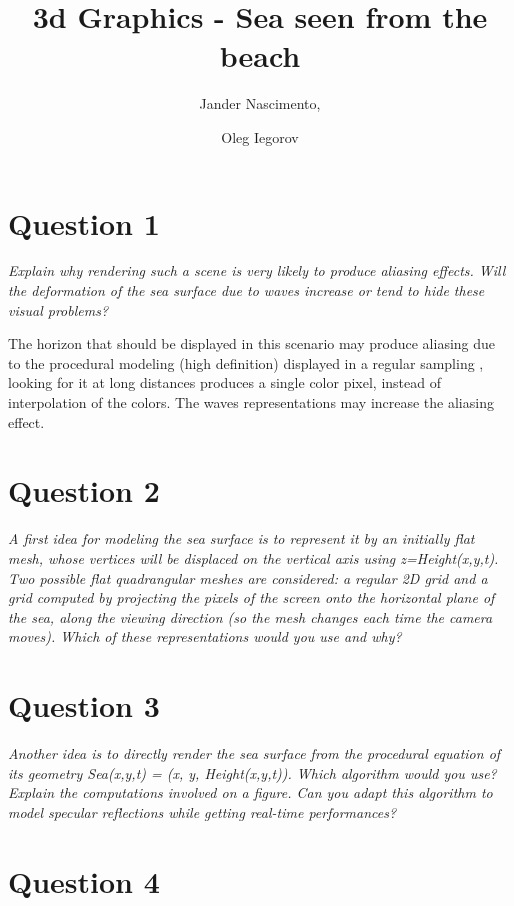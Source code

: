\documentclass{report}
\begin{document}
\title{3d Graphics - Sea seen from the beach}

\author{Jander Nascimento, 
\and Oleg Iegorov}

\maketitle

\section{Question 1}

\emph{Explain why rendering such a scene is very likely to produce aliasing effects. Will the
deformation of the sea surface due to waves increase or tend to hide these visual problems?}

The horizon that should be displayed in this scenario may produce aliasing due to the procedural modeling (high definition) displayed in a regular sampling \cite{iaow}, looking for it at long distances produces a single color pixel, instead of interpolation of the colors. The waves representations may increase the aliasing effect.

\section{Question 2}

\emph{A first idea for modeling the sea surface is to represent it by an initially flat mesh, whose
vertices will be displaced on the vertical axis using z=Height(x,y,t). Two possible flat
quadrangular meshes are considered: a regular 2D grid and a grid computed by projecting the
pixels of the screen onto the horizontal plane of the sea, along the viewing direction (so the
mesh changes each time the camera moves). Which of these representations would you use
and why?}

\section{Question 3}

\emph{Another idea is to directly render the sea surface from the procedural equation of its
geometry Sea(x,y,t) = (x, y, Height(x,y,t)). Which algorithm would you use? Explain the
computations involved on a figure. Can you adapt this algorithm to model specular
reflections while getting real-time performances?}

\section{Question 4}
\end{document}
